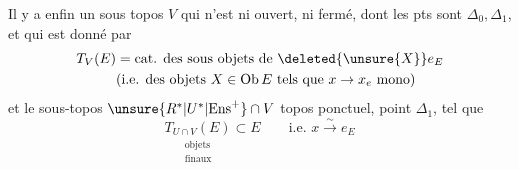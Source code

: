 
Il y a enfin un sous topos $V$  qui n'est ni ouvert, ni fermé,  dont les pts sont $\Delta_0,\Delta_1$, et qui  est donné par
\[
 \begin{aligned}
 T_V(E)&=\text{cat. des sous objets de }\deleted{\unsure{X}}e_E\\
 &\text{(i.e. des objets }X\in\operatorname{Ob}E\text{ tels que }x\to x_e\text{ mono)}
 \end{aligned}
\]
et le sous-topos $\unsure{R^*|U^*|\mathrm{Ens}^{+}}\cap V$ \deleted{$\simeq\unsure{\varphi}$} topos ponctuel, point $\Delta_1$, tel que
\[
 \underset{\substack{\text{objets}\\\text{finaux}}}{T_{U\cap V}(E)}\subset E\qquad
 \text{i.e. }x\xrightarrow{\sim}e_E
\]


